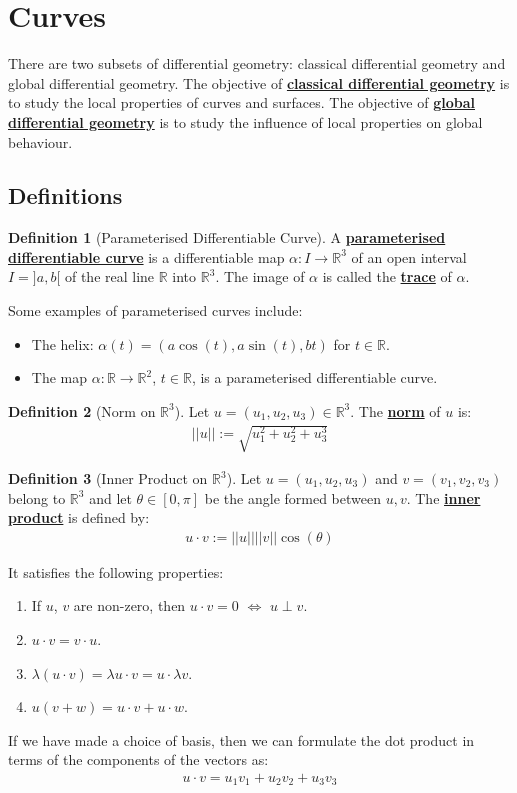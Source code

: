 \documentclass[11pt]{scrartcl}
\newcommand{\R}[0]{\mathbb{R}}
\theoremstyle{definition}
\newtheorem{definition}{Definition}
\theoremstyle{remark}
\newcommand{\dfn}[1]{\textbf{\underline{#1}}}
\begin{document}
{\section{Curves}
There are two subsets of differential geometry: classical differential geometry and global differential geometry. The objective of \dfn{classical differential geometry} is to study the local properties of curves and surfaces. The objective of \dfn{global differential geometry} is to study the influence of local properties on global behaviour. 
\subsection{Definitions}

\begin{definition}[Parameterised Differentiable Curve] 
	A \dfn{parameterised differentiable curve} is a differentiable map $ \alpha: I \rightarrow \R^3$ of an open interval $I = ]a,b[$ of the real line $\R$ into $\R^3$. The image of $\alpha$ is called the \dfn{trace} of $\alpha$. 
\end{definition}

Some examples of parameterised curves include: 
\begin{itemize}[noitemsep]
	\item The helix: $\alpha(t) = (a \cos (t), a \sin(t), bt)$ for $t \in \R$. 
	\item The map $\alpha: \R \rightarrow \R^2$, $t \in \R$, is a parameterised differentiable curve. 
\end{itemize}

\begin{definition}[Norm on $\R^3$]
	Let $u = (u_1, u_2, u_3) \in \R^3$. The \dfn{norm} of $u$ is: 
	\begin{align*}
		|| u || := \sqrt{ u_1^2 + u_2^2 + u_3^3} 
	\end{align*}
\end{definition}

\begin{definition}[Inner Product on $\R^3$] 
	Let $u = (u_1, u_2, u_3)$ and $v= (v_1, v_2, v_3)$ belong to $\R^3$ and let $\theta \in [0, \pi]$ be the angle formed between $u,v$. The \dfn{inner product} is defined by: 
	\begin{align}
		u \cdot v := || u || ||v|| \cos (\theta) 	
	\end{align}
\end{definition}
It satisfies the following properties: 
\begin{enumerate}[noitemsep]
	\item If $u$, $v$ are non-zero, then $u \cdot v = 0$ $\iff$ $u \perp v$. 
	\item $u \cdot v = v \cdot u$. 
	\item $\lambda (u \cdot v ) = \lambda u \cdot v =  u \cdot \lambda v$. 
	\item $u ( v + w) = u \cdot v + u \cdot w$. 
\end{enumerate}
If we have made a choice of basis, then we can formulate the dot product in terms of the components of the vectors as: 
\begin{align}
	u \cdot v = u_1 v_1 + u_2 v_2 + u_3 v_3 	
\end{align}

}
\end{document}
